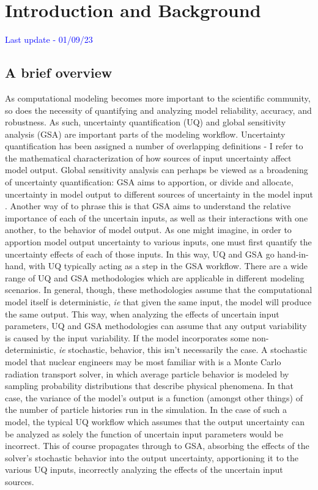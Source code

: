 
\chapter{Introduction and Background} \label{ch-introduction}
\textcolor{blue}{Last update - 01/09/23}
\section{A brief overview}\label{sec:overview}
As computational modeling becomes more important to the scientific community, so does the necessity of quantifying and analyzing model reliability, accuracy, and robustness. As such, uncertainty quantification (UQ) and global sensitivity analysis (GSA) are important parts of the modeling workflow. Uncertainty quantification has been assigned a number of overlapping definitions - I refer to the mathematical characterization of how sources of input uncertainty affect model output. Global sensitivity analysis can perhaps be viewed as a broadening of uncertainty quantification: GSA aims to apportion, or divide and allocate, uncertainty in model output to different sources of uncertainty in the model input \cite{saltelli2004}. Another way of to phrase this is that GSA aims to understand the relative importance of each of the uncertain inputs, as well as their interactions with one another, to the behavior of model output. As one might imagine, in order to apportion model output uncertainty to various inputs, one must first quantify the uncertainty effects of each of those inputs. In this way, UQ and GSA go hand-in-hand, with UQ typically acting as a step in the GSA workflow. 
There are a wide range of UQ and GSA methodologies which are applicable in different modeling scenarios. In general, though, these methodologies assume that the computational model itself is deterministic, \textit{ie} that given the same input, the model will produce the same output. This way, when analyzing the effects of uncertain input parameters, UQ and GSA methodologies can assume that any output variability is caused by the input variability. If the model incorporates some non-deterministic, \textit{ie} stochastic, behavior, this isn't necessarily the case. A stochastic model that nuclear engineers may be most familiar with is a Monte Carlo radiation transport solver, in which average particle behavior is modeled by sampling probability distributions that describe physical phenomena. In that case, the variance of the model's output is a function (amongst other things) of the number of particle histories run in the simulation. In the case of such a model, the typical UQ workflow which assumes that the output uncertainty can be analyzed as solely the function of uncertain input parameters would be incorrect. This of course propagates through to GSA, absorbing the effects of the solver's stochastic behavior into the output uncertainty, apportioning it to the various UQ inputs, incorrectly analyzing the effects of the uncertain input sources. 

